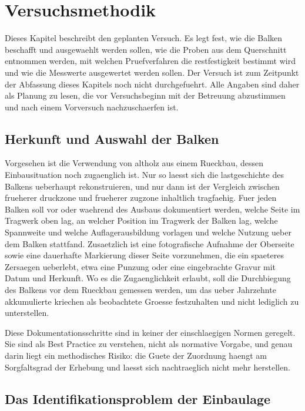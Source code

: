 \chapter{Versuchsmethodik}
\label{ch:strategy}

Dieses Kapitel beschreibt den geplanten Versuch. Es legt fest, wie die
Balken beschafft und ausgewaehlt werden sollen, wie die Proben aus dem
Querschnitt entnommen werden, mit welchen Pruefverfahren die
\gls{restfestigkeit} bestimmt wird und wie die Messwerte ausgewertet werden
sollen. Der Versuch ist zum Zeitpunkt der Abfassung dieses Kapitels noch
nicht durchgefuehrt. Alle Angaben sind daher als Planung zu lesen, die vor
Versuchsbeginn mit der Betreuung abzustimmen und nach einem Vorversuch
nachzuschaerfen ist.

\section{Herkunft und Auswahl der Balken}
\label{sec:material-herkunft}

Vorgesehen ist die Verwendung von \gls{altholz} aus einem Rueckbau, dessen
Einbausituation noch zugaenglich ist. Nur so laesst sich die \gls{lastgeschichte}
des Balkens ueberhaupt rekonstruieren, und nur dann ist der Vergleich zwischen
frueherer \gls{druckzone} und frueherer \gls{zugzone} inhaltlich tragfaehig.
Fuer jeden Balken soll vor oder waehrend des Ausbaus dokumentiert werden,
welche Seite im Tragwerk oben lag, an welcher Position im Tragwerk der Balken
lag, welche Spannweite und welche Auflagerausbildung vorlagen und welche
Nutzung ueber dem Balken stattfand. Zusaetzlich ist eine fotografische
Aufnahme der Oberseite sowie eine dauerhafte Markierung dieser Seite
vorzunehmen, die ein spaeteres Zersaegen ueberlebt, etwa eine Punzung oder
eine eingebrachte Gravur mit Datum und Herkunft. Wo es die Zugaenglichkeit
erlaubt, soll die Durchbiegung des Balkens vor dem Rueckbau gemessen werden,
um das ueber Jahrzehnte akkumulierte \gls{kriechen} als beobachtete Groesse
festzuhalten und nicht lediglich zu unterstellen.

Diese Dokumentationsschritte sind in keiner der einschlaegigen Normen
geregelt. Sie sind als Best Practice zu verstehen, nicht als normative
Vorgabe, und genau darin liegt ein methodisches Risiko: die Guete der
Zuordnung haengt am Sorgfaltsgrad der Erhebung und laesst sich nachtraeglich
nicht mehr herstellen.

\section{Das Identifikationsproblem der Einbaulage}
\label{sec:identifikation}

